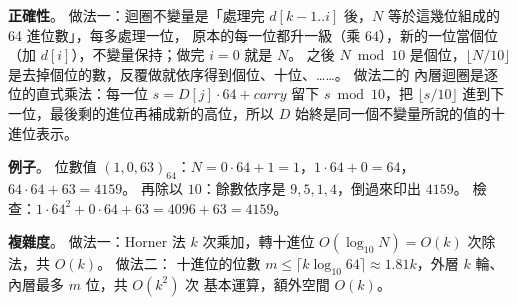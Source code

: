 \begin{pastsoln}
\textbf{正確性}。 做法一：迴圈不變量是「處理完 $d[k-1..i]$ 後，$N$ 等於這幾位組成的 64 進位數」，每多處理一位，
原本的每一位都升一級（乘 $64$），新的一位當個位（加 $d[i]$），不變量保持；做完 $i = 0$ 就是 $N$。 之後
$N \bmod 10$ 是個位，$\lfloor N/10 \rfloor$ 是去掉個位的數，反覆做就依序得到個位、十位、……。 做法二的
內層迴圈是逐位的直式乘法：每一位 $s = D[j] \cdot 64 + \mathit{carry}$ 留下 $s \bmod 10$，把 $\lfloor s/10 \rfloor$
進到下一位，最後剩的進位再補成新的高位，所以 $D$ 始終是同一個不變量所說的值的十進位表示。

\textbf{例子}。 位數值 $(1, 0, 63)_{64}$：$N = 0 \cdot 64 + 1 = 1$，$1 \cdot 64 + 0 = 64$，$64 \cdot 64 + 63 = 4159$。
再除以 $10$：餘數依序是 $9, 5, 1, 4$，倒過來印出 $4159$。 檢查：$1 \cdot 64^2 + 0 \cdot 64 + 63 = 4096 + 63 = 4159$。

\textbf{複雜度}。 做法一：Horner 法 $k$ 次乘加，轉十進位 $O(\log_{10} N) = O(k)$ 次除法，共 $O(k)$。 做法二：
十進位的位數 $m \le \lceil k \log_{10} 64 \rceil \approx 1.81k$，外層 $k$ 輪、內層最多 $m$ 位，共 $O(k^2)$ 次
基本運算，額外空間 $O(k)$。
\end{pastsoln}
